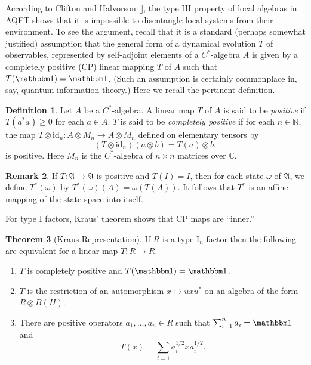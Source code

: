 \documentclass[11pt]{article}
\theoremstyle{definition}
\newtheorem{thm}{Theorem}[section]
\theoremstyle{definition}
\newtheorem{defn}[thm]{Definition}
\newtheorem{note}[thm]{Remark}
\theoremstyle{remark}
\def\7#1{{\mathbb #1}}
\def\8#1{{\mathbbm #1}}
\def\al#1{{\mathfrak #1}}
\def\om{\omega} \def\Om{\Omega} \def\dd{\partial} \def\D{\Delta}
\def\id{\mathrm{id}}
\begin{document}
According to Clifton and Halvorson [\citeyear{clif}], the type III
property of local algebras in AQFT shows that it is impossible to
disentangle local systems from their environment.  To see the
argument, recall that it is a standard (perhaps somewhat justified)
assumption that the general form of a dynamical evolution $T$ of
observables, represented by self-adjoint elements of a $C^*$-algebra
$A$ is given by a completely positive (CP) linear mapping $T$ of $A$
such that $T(\81 )=\81 $.  (Such an assumption is certainly
commonplace in, say, quantum information theory.)  Here we recall the
pertinent definition.

\begin{defn} Let $A$ be a $C^*$-algebra.  A linear map
  $T$ of $A$ is said to be \emph{positive} if
  $T(a^*a)\geq 0$ for each $a\in A$.  $T$ is said to be
  \emph{completely positive} if for each $n\in \7N$,
  the map $T\otimes \id _n:A\otimes M_n\to A\otimes
  M_n$ defined on elementary tensors by
$$ (T\otimes \id _n)(a\otimes b)=T(a)\otimes b ,$$
is positive.  Here $M_n$ is the $C^*$-algebra of
$n\times n$ matrices over $\7C$.  \end{defn}

\begin{note} If $T:\al A\to \al A$ is positive and
  $T(I)=I$, then for each state $\om$ of $\al A$, we
  define $T^*(\om )$ by $T^*(\om )(A)=\om (T(A))$.  It
  follows that $T^*$ is an affine mapping of the state
  space into itself.  \end{note}  

%

For type I factors, Kraus' theorem \cite{kraus} shows
that CP maps are ``inner.''
\begin{thm}[Kraus Representation] If $R$ is a type I$_n$ factor then
  the following are equivalent for a linear map $T:R\to R$.
\begin{enumerate}
\item $T$ is completely positive and $T(\81 )=\81 $.
\item $T$ is the restriction of an automorphism $x\mapsto uxu^*$ on an
  algebra of the form $R\otimes B(H)$.
\item There are positive operators $a_1,\dots ,a_n\in R$ such that
  $\sum _{i=1}^{n}a_i=\81$ and
  \begin{equation} T(x)=\sum _{i=1}a_i^{1/2}xa_i^{1/2} .\label{kraus} \end{equation}
\end{enumerate}
\end{thm}
\end{document}
